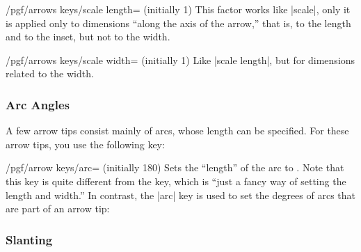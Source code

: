 \begin{key}{/pgf/arrows keys/scale length= (initially 1)}
  This factor works like |scale|, only it is applied only to
  dimensions ``along the axis of the arrow,'' that is, to the length
  and to the inset, but not to the width. 
\begin{codeexample}[]
\end{codeexample}  
\end{key}

\begin{key}{/pgf/arrows keys/scale width= (initially 1)}
  Like |scale length|, but for dimensions related to the width.
\begin{codeexample}[]
\end{codeexample}  
\end{key}


\subsubsection{Arc Angles}

A few arrow tips consist mainly of arcs, whose length can be
specified. For these arrow tips, you use the following key:

\begin{key}{/pgf/arrow keys/arc= (initially 180)}
  Sets the ``length'' of the arc to . Note that this key
  is quite different from the  key, which is ``just a
  fancy way of setting the length and width.'' In contrast, the |arc|
  key is used to set the degrees of arcs that are part of an arrow
  tip:
\begin{codeexample}[]
\end{codeexample}  
\end{key}


\subsubsection{Slanting}


